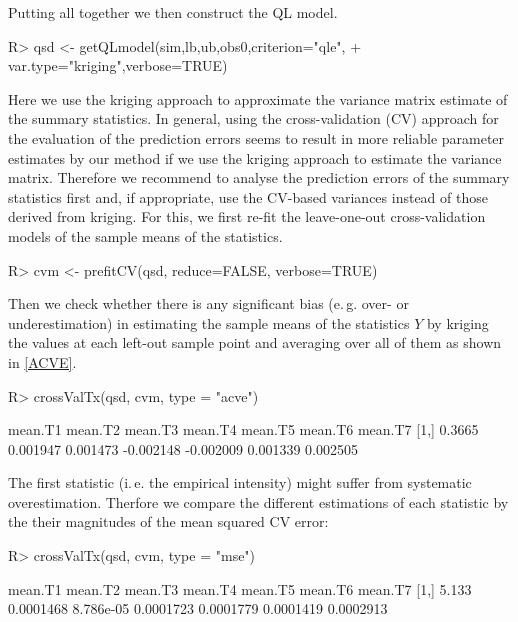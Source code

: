 \documentclass[article, nojss]{jss}
\numberwithin{equation}{section}			%
\begin{document}
Putting all together we then construct the QL model.
\begin{Schunk}
\begin{Sinput}
R> qsd <- getQLmodel(sim,lb,ub,obs0,criterion="qle",
+          var.type="kriging",verbose=TRUE)
\end{Sinput}
\end{Schunk}
Here we use the kriging approach to approximate the variance matrix estimate
of the summary statistics. In general, using the cross-validation (CV) approach
for the evaluation of the prediction errors seems to result in more reliable
parameter estimates by our method if we use the kriging approach to estimate
the variance matrix. Therefore we recommend to analyse the prediction errors of
the summary statistics first and, if appropriate, use the CV-based variances
instead of those derived from kriging. For this, we first re-fit the
leave-one-out cross-validation models of the sample means of the statistics.
\begin{Schunk}
\begin{Sinput}
R> cvm <- prefitCV(qsd, reduce=FALSE, verbose=TRUE)
\end{Sinput}
\end{Schunk}
Then we check whether there is any significant bias (e.\,g. over- or
underestimation) in estimating the sample means of the statistics $Y$ by
kriging the values at each left-out sample point and averaging over all of them
as shown in \eqref{ACVE}.
\begin{Schunk}
\begin{Sinput}
R> crossValTx(qsd, cvm, type = "acve")
\end{Sinput}
\begin{Soutput}
     mean.T1  mean.T2  mean.T3   mean.T4   mean.T5  mean.T6  mean.T7
[1,]  0.3665 0.001947 0.001473 -0.002148 -0.002009 0.001339 0.002505
\end{Soutput}
\end{Schunk}
The first statistic (i.\,e. the empirical intensity) might suffer from
systematic overestimation. Therfore we compare the different estimations of
each statistic by the their magnitudes of the mean squared CV error:
\begin{Schunk}
\begin{Sinput}
R> crossValTx(qsd, cvm, type = "mse")
\end{Sinput}
\begin{Soutput}
     mean.T1   mean.T2   mean.T3   mean.T4   mean.T5   mean.T6   mean.T7
[1,]   5.133 0.0001468 8.786e-05 0.0001723 0.0001779 0.0001419 0.0002913
\end{Soutput}
\end{Schunk}
\end{document}
